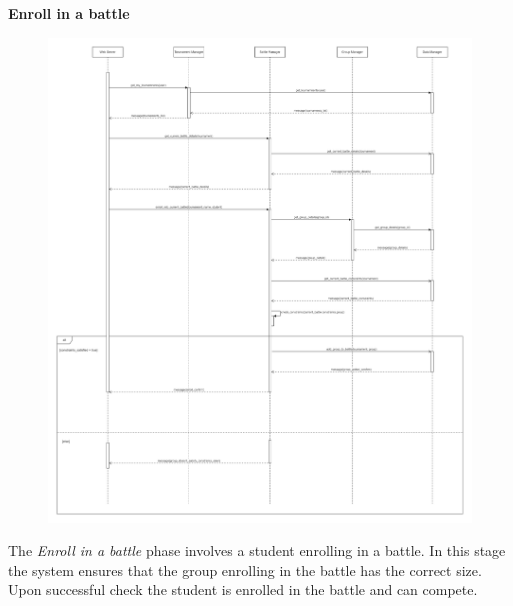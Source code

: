 \documentclass[../DD.tex]{subfiles}
\begin{document}
    \textbf{Enroll in a battle}
    \begin{figure}[H]
        \centering
        \hspace*{-2cm}
        \includegraphics[width=1.15\textwidth]{../assets/section_2/EnrollInABattle.png}
    \end{figure}
    The \textit{Enroll in a battle} phase involves a student enrolling in a battle.
    In this stage the system ensures that the group enrolling in the battle has the correct size. Upon successful check the student is enrolled in the battle and can compete.
    \restoregeometry
    \newpage
\end{document}
